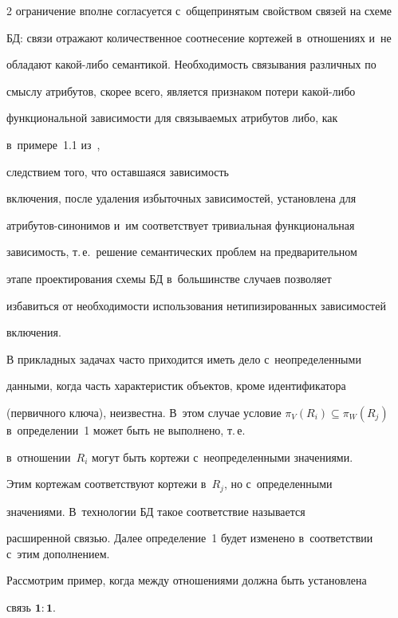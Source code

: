 \begin{multicols}{2}
ограничение вполне согласуется с~общепринятым свойством связей на схеме

БД: связи отражают количественное соотнесение кортежей в~отношениях и~не

обладают ка\-кой-ли\-бо семантикой. Необходимость связывания различных по

смыслу атрибутов, скорее всего, является признаком потери ка\-кой-ли\-бо

функциональной зависимости для связываемых атрибутов либо, как\linebreak

 в~примере~1.1 из~\cite{7-z}, 

следствием того, что остав\-шаяся зависимость

включения, после удаления избыточных зависимостей, установлена для

ат\-ри\-бу\-тов-си\-но\-ни\-мов и~им соответствует тривиальная функциональная

зависимость, т.\,е.\ решение семантических проблем на предварительном

этапе проектирования схемы БД в~большинстве случаев позволяет

избавиться от не\-об\-хо\-ди\-мости использования нетипизированных зависимостей

включения.



  В прикладных задачах часто приходится иметь дело с~неопределенными

данными, когда часть характеристик объектов, кроме идентификатора

(первичного ключа), неизвестна. В~этом случае условие $\pi_V(R_i)\subseteq

\pi_W(R_j)$ в~определении~1 может быть не выполнено, т.\,е.\

в~отношении~$R_i$ могут быть кортежи с~неопределенными значениями.

Этим кортежам соответствуют кортежи в~$R_j$, но с~определенными

значениями. В~технологии БД такое соответствие называется

расширенной связью. Далее определение~1 будет изменено в~соответствии с~этим дополнением.



  Рассмотрим пример, когда между отношениями должна быть установлена

связь $\mathbf{1}:\mathbf{1}$.



  \medskip




\end{multicols}
